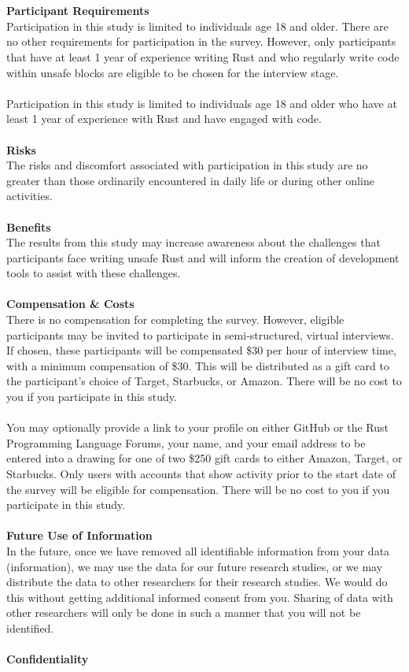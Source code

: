 \\\\
\noindent\textbf{Participant Requirements}\\
\noindent{} Participation in this study is limited to individuals age 18 and older. There are no other requirements for participation in the survey. However, only participants that have at least 1 year of experience writing Rust and who regularly write code within unsafe blocks are eligible to be chosen for the interview stage.
\\\\
\noindent{} Participation in this study is limited to individuals age 18 and older who have at least 1 year of experience with Rust and have engaged with \unsafe code.
\\\\
\noindent\textbf{Risks}\\
The risks and discomfort associated with participation in this study are no greater than those ordinarily encountered in daily life or during other online activities.
\\\\
\noindent\textbf{Benefits}\\
The results from this study may increase awareness about the challenges that participants face writing unsafe Rust and will inform the creation of development tools to assist with these challenges.
\\\\
\noindent\textbf{Compensation \& Costs}\\
\noindent{}  There is no compensation for completing the survey. However, eligible participants may be invited to participate in semi-structured, virtual interviews. If chosen, these participants will be compensated \$30 per hour of interview time, with a minimum compensation of \$30. This will be distributed as a gift card to the participant’s choice of Target, Starbucks, or Amazon. There will be no cost to you if you participate in this study.
\\\\
\noindent{} You may optionally provide a link to your profile on either GitHub or the Rust Programming Language Forums, your name, and your email address to be entered into a drawing for one of two \$250 gift cards to either Amazon, Target, or Starbucks. Only users with accounts that show activity prior to the start date of the survey will be eligible for compensation. There will be no cost to you if you participate in this study.
\\\\
\noindent\textbf{Future Use of Information}\\
In the future, once we have removed all identifiable information from your data (information), we may use the data for our future research studies, or we may distribute the data to other researchers for their research studies. We would do this without getting additional informed consent from you. Sharing of data with other researchers will only be done in such a manner that you will not be identified.
\\\\
\noindent\textbf{Confidentiality}

